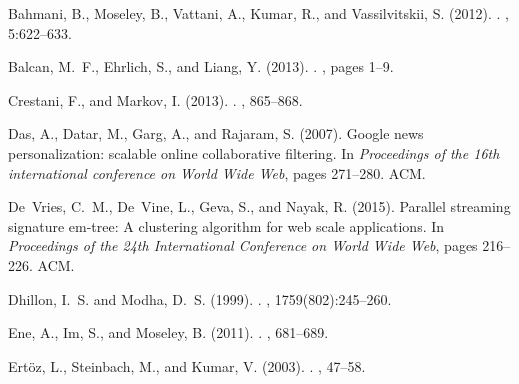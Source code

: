 \documentclass[a4paper]{article}
\begin{document}

% 
\begin{thebibliography}{}

Bahmani, B., Moseley, B., Vattani, A., Kumar, R., and Vassilvitskii, S. (2012).
.
, 5:622--633.

Balcan, M.~F., Ehrlich, S., and Liang, Y. (2013).
.
, pages 1--9.

Crestani, F., and Markov, I. (2013).
.
, 865--868.

Das, A., Datar, M., Garg, A., and Rajaram, S. (2007).
\newblock Google news personalization: scalable online collaborative filtering.
\newblock In {\em Proceedings of the 16th international conference on World
  Wide Web}, pages 271--280. ACM.

De~Vries, C.~M., De~Vine, L., Geva, S., and Nayak, R. (2015).
\newblock Parallel streaming signature em-tree: A clustering algorithm for web
  scale applications.
\newblock In {\em Proceedings of the 24th International Conference on World
  Wide Web}, pages 216--226. ACM.

Dhillon, I.~S. and Modha, D.~S. (1999).
.
, 1759(802):245--260.

Ene, A., Im, S., and Moseley, B. (2011).
.
, 681--689.

Ert{\"o}z, L., Steinbach, M., and Kumar, V. (2003).
.
, 47--58.



\end{thebibliography}
\end{document}
